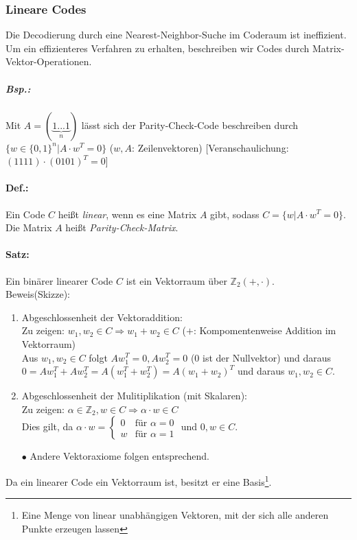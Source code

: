 \subsubsection{Lineare Codes}
Die Decodierung durch eine Nearest-Neighbor-Suche im Coderaum ist ineffizient. Um ein effizienteres Verfahren zu erhalten, beschreiben wir Codes durch Matrix-Vektor-Operationen.
\subparagraph{Bsp.:} Mit $A = (\underbrace{1 ... 1}_{n})$ lässt sich der Parity-Check-Code beschreiben durch $\{w\in \{0,1\}^n| A\cdot w^T=0\}$ ($w,A$: Zeilenvektoren) [Veranschaulichung: $(1111)\cdot(0101)^T=0$]

\paragraph{Def.:} Ein Code $C$ heißt \emph{linear}, wenn es eine Matrix $A$ gibt, sodass $C=\{w|A\cdot w^T=0\}$.\\
Die Matrix $A$ heißt \emph{Parity-Check-Matrix}.

\paragraph{Satz:} Ein binärer linearer Code $C$ ist ein Vektorraum über $\mathbb{Z}_2(+,\cdot)$.\\
Beweis(Skizze):
\begin{enumerate}
\item Abgeschlossenheit der Vektoraddition:\\
Zu zeigen: $w_1,w_2\in C \Rightarrow w_1+w_2 \in C$ ($+$: Kompomentenweise Addition im Vektorraum)\\
Aus $w_1,w_2\in C$ folgt $Aw_1^T=0, Aw_2^T=0$ ($0$ ist der Nullvektor) und daraus $0=Aw_1^T+Aw_2^T=A(w_1^T+w_2^T)=A(w_1+w_2)^T$ und daraus $w_1,w_2 \in C$.
\item Abgeschlossenheit der Mulitiplikation (mit Skalaren):\\
Zu zeigen: $\alpha \in \mathbb{Z}_2, w \in C \Rightarrow \alpha \cdot w \in C$\\
Dies gilt, da $\alpha\cdot w =\begin{cases}
0 & \text{für }\alpha =0\\
w & \text{für } \alpha =1
\end{cases}$ und $0,w \in C$.
\item[$\bullet$] Andere Vektoraxiome folgen entsprechend.
\end{enumerate}
Da ein linearer Code ein Vektorraum ist, besitzt er eine Basis\footnote{Eine Menge von linear unabhängigen Vektoren, mit der sich alle anderen Punkte erzeugen lassen}.

